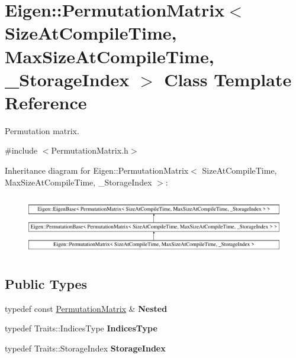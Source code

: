 \hypertarget{class_eigen_1_1_permutation_matrix}{}\section{Eigen\+::Permutation\+Matrix$<$ Size\+At\+Compile\+Time, Max\+Size\+At\+Compile\+Time, \+\_\+\+Storage\+Index $>$ Class Template Reference}
\label{class_eigen_1_1_permutation_matrix}


Permutation matrix.  




{\ttfamily \#include $<$Permutation\+Matrix.\+h$>$}

Inheritance diagram for Eigen\+::Permutation\+Matrix$<$ Size\+At\+Compile\+Time, Max\+Size\+At\+Compile\+Time, \+\_\+\+Storage\+Index $>$\+:\begin{figure}[H]
\begin{center}
\leavevmode
\includegraphics[height=2.633229cm]{class_eigen_1_1_permutation_matrix}
\end{center}
\end{figure}
\subsection*{Public Types}
\begin{DoxyCompactItemize}
\item 
\mbox{\label{class_eigen_1_1_permutation_matrix_ac18d5e0d86028ccac8d1d4280aa01053}} 
typedef const \mbox{\hyperlink{class_eigen_1_1_permutation_matrix}{Permutation\+Matrix}} \& {\bfseries Nested}
\item 
\mbox{\label{class_eigen_1_1_permutation_matrix_a8fd794192071c85223d197feb2dcecb3}} 
typedef Traits\+::\+Indices\+Type {\bfseries Indices\+Type}
\item 
\mbox{\label{class_eigen_1_1_permutation_matrix_aff6efa7c9f220a25d9ba9e09b354b2d8}} 
typedef Traits\+::\+Storage\+Index {\bfseries Storage\+Index}
\end{DoxyCompactItemize}
